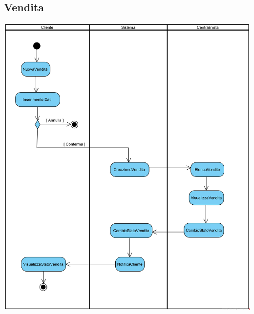\documentclass[12pt]{article}
\begin{document}
\subsection{Vendita}
\begin{center}
\includegraphics[width=\textwidth]{ActivityDiagram/Vendita}
\end{center}
\end{document}
